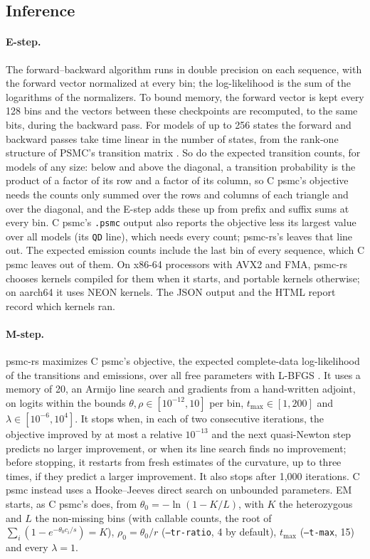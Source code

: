 \documentclass[11pt]{article}
\newcommand{\psmcrs}{psmc-rs}
\newcommand{\opt}[1]{\texttt{#1}}
\begin{document}
\subsection*{Inference}

\paragraph{E-step.} The forward--backward algorithm runs in double precision on each sequence, with the forward vector normalized at every bin; the log-likelihood is the sum of the logarithms of the normalizers. To bound memory, the forward vector is kept every 128 bins and the vectors between these checkpoints are recomputed, to the same bits, during the backward pass. For models of up to 256 states the forward and backward passes take time linear in the number of states, from the rank-one structure of PSMC's transition matrix \citep{harris2014}. So do the expected transition counts, for models of any size: below and above the diagonal, a transition probability is the product of a factor of its row and a factor of its column, so C psmc's objective needs the counts only summed over the rows and columns of each triangle and over the diagonal, and the E-step adds these up from prefix and suffix sums at every bin. C psmc's \texttt{.psmc} output also reports the objective less its largest value over all models (its \texttt{QD} line), which needs every count; \psmcrs{}'s leaves that line out. The expected emission counts include the last bin of every sequence, which C psmc leaves out of them. On x86-64 processors with AVX2 and FMA, \psmcrs{} chooses kernels compiled for them when it starts, and portable kernels otherwise; on aarch64 it uses NEON kernels. The JSON output and the HTML report record which kernels ran.

\paragraph{M-step.} \psmcrs{} maximizes C psmc's objective, the expected complete-data log-likelihood of the transitions and emissions, over all free parameters with L-BFGS \citep{liu1989}. It uses a memory of 20, an Armijo line search and gradients from a hand-written adjoint, on logits within the bounds $\theta,\rho\in[10^{-12},10]$ per bin, $t_{\max}\in[1,200]$ and $\lambda\in[10^{-6},10^4]$. It stops when, in each of two consecutive iterations, the objective improved by at most a relative $10^{-13}$ and the next quasi-Newton step predicts no larger improvement, or when its line search finds no improvement; before stopping, it restarts from fresh estimates of the curvature, up to three times, if they predict a larger improvement. It also stops after 1,000 iterations. C psmc instead uses a Hooke--Jeeves direct search \citep{hooke1961} on unbounded parameters. EM starts, as C psmc's does, from $\theta_0=-\ln(1-K/L)$, with $K$ the heterozygous and $L$ the non-missing bins (with callable counts, the root of $\sum_i(1-e^{-\theta_0c_i/s})=K$), $\rho_0=\theta_0/r$ (\opt{--tr-ratio}, 4 by default), $t_{\max}$ (\opt{--t-max}, 15) and every $\lambda=1$.
\end{document}
